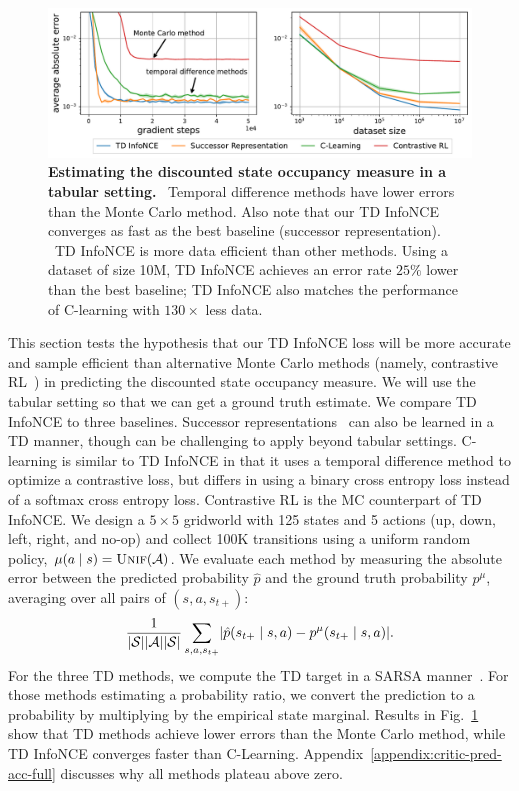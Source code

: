 \documentclass{article} %
\DeclarePairedDelimiter\abs{\lvert}{\rvert}%
\begin{document}
\begin{figure}[t]
    \centering
    \vspace{-0.5em}
    \includegraphics[width=\linewidth]{figures/critic_analysis/p_future_est_errs_v2.pdf}
    \caption{ \footnotesize \textbf{
    Estimating the discounted state occupancy measure in a tabular setting.} \figleft~Temporal difference methods have lower errors than the Monte Carlo method. Also note that our TD InfoNCE converges as fast as the best baseline (successor representation). \figright~TD InfoNCE is more data efficient than other methods. Using a dataset of size 10M, TD InfoNCE achieves an error rate $25\%$ lower than the best baseline; TD InfoNCE also matches the performance of C-learning with $130\times$ less data.
    }
    \label{fig:discounted-state-occupancy-measure-est-errs}
\end{figure}

This section tests the hypothesis that our TD InfoNCE loss will be more accurate and sample efficient than alternative Monte Carlo methods (namely, contrastive RL~\citep{eysenbach2022contrastive}) in predicting the discounted state occupancy measure. We will use the tabular setting so that we can get a ground truth estimate.
We compare TD InfoNCE to three baselines.
Successor representations~\citep{dayan1993improving} can also be learned in a TD manner, though can be challenging to apply beyond tabular settings. C-learning is similar to TD InfoNCE in that it uses a temporal difference method to optimize a contrastive loss, but differs in using a binary cross entropy loss instead of a softmax cross entropy loss. Contrastive RL is the MC counterpart of TD InfoNCE.
We design a $5 \times 5$ gridworld with 125 states and 5 actions (up, down, left, right, and no-op) and collect 100K transitions using a uniform random policy, $\mu(a \mid s) = \textsc{Unif}({\mathcal{A}})$. 
We evaluate each method by measuring the absolute error between the predicted probability $\hat{p}$ and the ground truth probability $p^{\mu}$, averaging over all pairs of $(s, a, s_{t+})$:
\begin{align*}
    \frac{1}{ \lvert \gS \rvert \lvert \gA \rvert \lvert \gS \rvert} \sum_{s, a, s_{t+}} \abs{ \hat{p}(s_{t+} \mid s, a) - p^{\mu}(s_{t+} \mid s, a)}.
\end{align*}
For the three TD methods, we compute the TD target in a SARSA manner~\citep{sutton2018reinforcement}. For those methods estimating a probability ratio, we convert the prediction to a probability by multiplying by the empirical state marginal. Results in Fig.~\ref{fig:discounted-state-occupancy-measure-est-errs} show that TD methods achieve lower errors than the Monte Carlo method, while TD InfoNCE converges faster than C-Learning. 
Appendix~\ref{appendix:critic-pred-acc-full} discusses why all methods plateau above zero.
\end{document}
